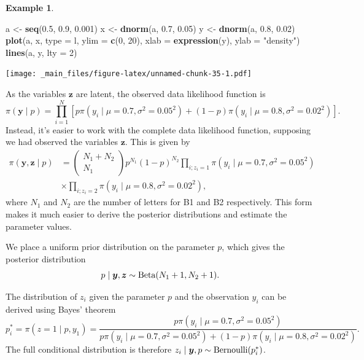 \documentclass[
]{book}
\newenvironment{Shaded}{\begin{snugshade}}{\end{snugshade}}
\newcommand{\AttributeTok}[1]{\textcolor[rgb]{0.13,0.29,0.53}{#1}}
\newcommand{\DecValTok}[1]{\textcolor[rgb]{0.00,0.00,0.81}{#1}}
\newcommand{\FloatTok}[1]{\textcolor[rgb]{0.00,0.00,0.81}{#1}}
\newcommand{\FunctionTok}[1]{\textcolor[rgb]{0.13,0.29,0.53}{\textbf{#1}}}
\newcommand{\NormalTok}[1]{#1}
\newcommand{\OtherTok}[1]{\textcolor[rgb]{0.56,0.35,0.01}{#1}}
\newcommand{\StringTok}[1]{\textcolor[rgb]{0.31,0.60,0.02}{#1}}
\theoremstyle{definition}
\theoremstyle{definition}
\newtheorem{example}{Example}[chapter]
\theoremstyle{definition}
\theoremstyle{definition}
\theoremstyle{remark}
\begin{document}
\begin{example}
\begin{Shaded}
\begin{Highlighting}[]
\NormalTok{a }\OtherTok{\textless{}{-}} \FunctionTok{seq}\NormalTok{(}\FloatTok{0.5}\NormalTok{, }\FloatTok{0.9}\NormalTok{, }\FloatTok{0.001}\NormalTok{)}
\NormalTok{x }\OtherTok{\textless{}{-}} \FunctionTok{dnorm}\NormalTok{(a, }\FloatTok{0.7}\NormalTok{, }\FloatTok{0.05}\NormalTok{)}
\NormalTok{y }\OtherTok{\textless{}{-}} \FunctionTok{dnorm}\NormalTok{(a, }\FloatTok{0.8}\NormalTok{, }\FloatTok{0.02}\NormalTok{)}
\FunctionTok{plot}\NormalTok{(a, x, }\AttributeTok{type =} \StringTok{\textquotesingle{}l\textquotesingle{}}\NormalTok{, }\AttributeTok{ylim =} \FunctionTok{c}\NormalTok{(}\DecValTok{0}\NormalTok{, }\DecValTok{20}\NormalTok{), }\AttributeTok{xlab =} \FunctionTok{expression}\NormalTok{(y),}
     \AttributeTok{ylab =} \StringTok{"density"}\NormalTok{)}
\FunctionTok{lines}\NormalTok{(a, y, }\AttributeTok{lty =} \DecValTok{2}\NormalTok{)}
\end{Highlighting}
\end{Shaded}

\texttt{[image: \_main\_files/figure-latex/unnamed-chunk-35-1.pdf]}

As the variables \(\boldsymbol{z}\) are latent, the observed data likelihood function is
\[
\pi(\boldsymbol{y} \mid  p) =\prod_{i=1}^N \left[ p\pi(y_i \mid \mu = 0.7, \sigma^2 = 0.05^2) + (1-p)\pi(y_i \mid \mu = 0.8, \sigma^2 = 0.02^2)\right].
\]
Instead, it's easier to work with the complete data likelihood function, supposing we had observed the variables \(\boldsymbol{z}\). This is given by
\begin{align*}
\pi(\boldsymbol{y}, \boldsymbol{z} \mid  p) &= \begin{pmatrix} N_1 + N_2
\\ N_1\end{pmatrix}p^{N_1}(1-p)^{N_2} \prod_{i; z_i = 1}\pi(y_i \mid \mu = 0.7, \sigma^2 = 0.05^2)  \\
&\times\prod_{i; z_i = 2}\pi(y_i \mid \mu = 0.8, \sigma^2 = 0.02^2),
\end{align*}
where \(N_1\) and \(N_2\) are the number of letters for B1 and B2 respectively. This form makes it much easier to derive the posterior distributions and estimate the parameter values.

We place a uniform prior distribution on the parameter \(p\), which gives the posterior distribution
\[
p \mid \boldsymbol{y}, \boldsymbol{z} \sim \hbox{Beta}(N_1 + 1, N_2 + 1).
\]

The distribution of \(z_i\) given the parameter \(p\) and the observation \(y_i\) can be derived using Bayes' theorem
\[
p^*_i = \pi(z = 1 \mid p, y_1) = \frac{p\pi(y_i \mid \mu = 0.7, \sigma^2 = 0.05^2)}{p\pi(y_i \mid \mu = 0.7, \sigma^2 = 0.05^2) + (1-p)\pi(y_i \mid \mu = 0.8, \sigma^2 = 0.02^2)}.
\]
The full conditional distribution is therefore \(z_i \mid \boldsymbol{y}, p \sim \hbox{Bernoulli}(p^*_i)\).


\end{example}
\end{document}
